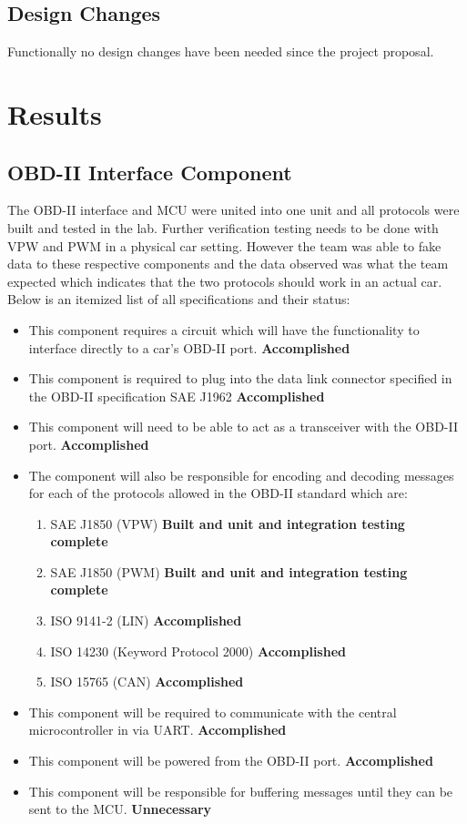 \documentclass[12pt,letterpaper]{article}
\begin{document}
\subsection{Design Changes}
Functionally no design changes have been needed since the project proposal.

\newpage

\section{Results}
\subsection{OBD-II Interface Component}
The OBD-II interface and MCU were united into one unit and all protocols were built and tested in the lab. Further verification testing needs to be done with VPW and PWM in a physical car setting. However the team was able to fake data to these respective components and the data observed was what the team expected which indicates that the two protocols should work in an actual car. Below is an itemized list of all specifications and their status:

\begin{itemize}
	\item This component requires a circuit which will have the functionality to interface directly to a car's OBD-II port. \textbf{Accomplished}
	\item This component is required to plug into the data link connector specified in the OBD-II specification SAE J1962 \textbf{Accomplished}
	\item This component will need to be able to act as a transceiver with the OBD-II port. \textbf{Accomplished}
	\item The component will also be responsible for encoding and decoding messages for each of the protocols allowed in the OBD-II standard which are: 
	\begin{enumerate}
		\item SAE J1850 (VPW) \textbf{Built and unit and integration testing complete}
		\item SAE J1850 (PWM) \textbf{Built and unit and integration testing complete}
		\item ISO 9141-2 (LIN) \textbf{Accomplished}
		\item ISO 14230 (Keyword Protocol 2000) \textbf{Accomplished}
		\item ISO 15765 (CAN) \textbf{Accomplished}
	\end{enumerate}
	\item This component will be required to communicate with the central microcontroller in via UART. \textbf{Accomplished}
	\item This component will be powered from the OBD-II port. \textbf{Accomplished}
	\item This component will be responsible for buffering messages until they can be sent to the MCU. \textbf{Unnecessary}
\end{itemize}
\end{document}

